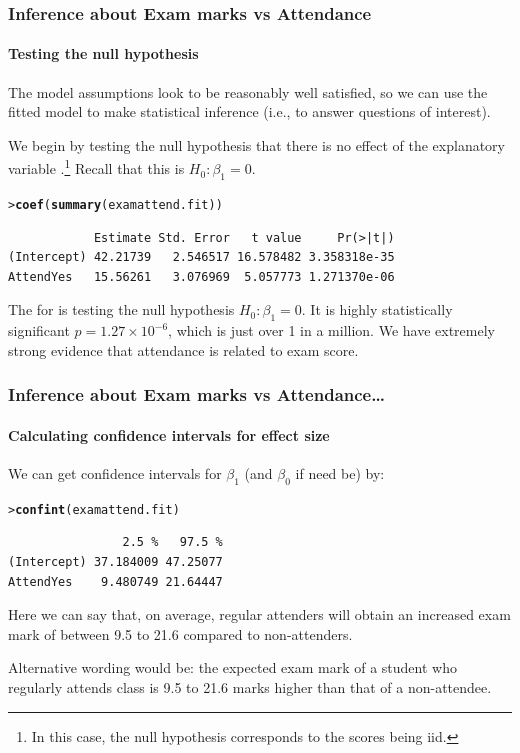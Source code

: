 \documentclass{beamer}\usepackage[]{graphicx}\usepackage[]{xcolor}
\makeatletter
\newcommand{\hlstd}[1]{\textcolor[rgb]{0.345,0.345,0.345}{#1}}%
\newcommand{\hlkwd}[1]{\textcolor[rgb]{0.737,0.353,0.396}{\textbf{#1}}}%
\newenvironment{kframe}{%
 \def\at@end@of@kframe{}%
 \ifinner\ifhmode%
  \def\at@end@of@kframe{\end{minipage}}%
  \begin{minipage}{\columnwidth}%
 \fi\fi%
 \def\FrameCommand##1{\hskip\@totalleftmargin \hskip-\fboxsep
 \colorbox{shadecolor}{##1}\hskip-\fboxsep
     \hskip-\linewidth \hskip-\@totalleftmargin \hskip\columnwidth}%
 \MakeFramed {\advance\hsize-\width
   \@totalleftmargin\z@ \linewidth\hsize
   \@setminipage}}%
 {\par\unskip\endMakeFramed%
 \at@end@of@kframe}
\newenvironment{knitrout}{}{} %
\makeatother
\begin{document}
\begin{frame}[fragile]
\frametitle{Inference about Exam marks vs Attendance}
\framesubtitle{Testing the null hypothesis}
The model assumptions look to be reasonably well satisfied, so we can use the fitted model to make statistical inference (i.e., to answer questions of interest).
\bigskip

We begin by testing the null hypothesis that there is no effect of the explanatory variable .\footnote{In this case, the null hypothesis corresponds to the  scores being iid.} Recall that this is $H_0:\beta_1=0$. 
\bigskip

\begin{knitrout}\scriptsize
{}\color{fgcolor}\begin{kframe}
\begin{alltt}
\hlstd{> }\hlkwd{coef}\hlstd{(}\hlkwd{summary}\hlstd{(examattend.fit))}
\end{alltt}
\begin{verbatim}
            Estimate Std. Error   t value     Pr(>|t|)
(Intercept) 42.21739   2.546517 16.578482 3.358318e-35
AttendYes   15.56261   3.076969  5.057773 1.271370e-06
\end{verbatim}
\end{kframe}
\end{knitrout}



The \pval{} for  is testing the null hypothesis $H_0: \beta_1=0$.
It is highly statistically significant $p=\ensuremath{1.27\times 10^{-6}}$, which is just over 1 in a million.
We have extremely strong evidence that attendance is related to exam score.

\end{frame}



\begin{frame}[fragile]
\frametitle{Inference about Exam marks vs Attendance\ldots}
\framesubtitle{Calculating confidence intervals for effect size}
We can get confidence intervals for $\beta_1$ (and $\beta_0$ if need be) by:
\begin{knitrout}\scriptsize
{}\color{fgcolor}\begin{kframe}
\begin{alltt}
\hlstd{> }\hlkwd{confint}\hlstd{(examattend.fit)}
\end{alltt}
\begin{verbatim}
                2.5 %   97.5 %
(Intercept) 37.184009 47.25077
AttendYes    9.480749 21.64447
\end{verbatim}
\end{kframe}
\end{knitrout}

\medskip
Here we can say that, on average,  regular attenders will obtain an increased exam mark of between  9.5 to 21.6 compared to non-attenders.

\medskip
Alternative wording would be: the expected exam mark of a student who regularly attends class is 9.5 to 21.6 marks higher than that of a non-attendee.

\end{frame}
\end{document}
